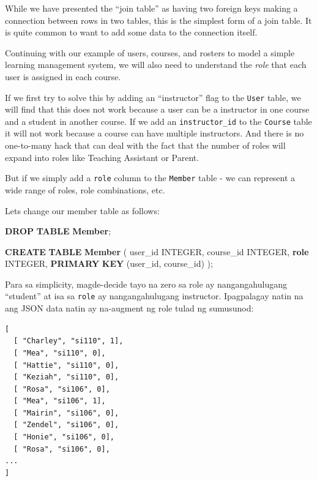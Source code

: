 \documentclass[10pt,]{book}
\newenvironment{Shaded}{}{}
\newcommand{\DataTypeTok}[1]{\textcolor[rgb]{0.56,0.13,0.00}{#1}}
\newcommand{\KeywordTok}[1]{\textcolor[rgb]{0.00,0.44,0.13}{\textbf{#1}}}
\newcommand{\NormalTok}[1]{#1}
\begin{document}
While we have presented the ``join table'' as having two foreign keys
making a connection between rows in two tables, this is the simplest
form of a join table. It is quite common to want to add some data to the
connection itself.

Continuing with our example of users, courses, and rosters to model a
simple learning management system, we will also need to understand the
\emph{role} that each user is assigned in each course.

If we first try to solve this by adding an ``instructor'' flag to the
\texttt{User} table, we will find that this does not work because a user
can be a instructor in one course and a student in another course. If we
add an \texttt{instructor\_id} to the \texttt{Course} table it will not
work because a course can have multiple instructors. And there is no
one-to-many hack that can deal with the fact that the number of roles
will expand into roles like Teaching Assistant or Parent.

But if we simply add a \texttt{role} column to the \texttt{Member} table
- we can represent a wide range of roles, role combinations, etc.

Lets change our member table as follows:

\begin{Shaded}
\begin{Highlighting}[]
\KeywordTok{DROP} \KeywordTok{TABLE} \KeywordTok{Member}\NormalTok{;}

\KeywordTok{CREATE} \KeywordTok{TABLE} \KeywordTok{Member}\NormalTok{ (}
\NormalTok{    user\_id     }\DataTypeTok{INTEGER}\NormalTok{,}
\NormalTok{    course\_id   }\DataTypeTok{INTEGER}\NormalTok{,}
    \KeywordTok{role}        \DataTypeTok{INTEGER}\NormalTok{,}
    \KeywordTok{PRIMARY} \KeywordTok{KEY}\NormalTok{ (user\_id, course\_id)}
\NormalTok{);}
\end{Highlighting}
\end{Shaded}

Para sa simplicity, magde-decide tayo na zero sa role ay
nangangahulugang ``student'' at isa sa \texttt{role} ay nangangahulugang
instructor. Ipagpalagay natin na ang JSON data natin ay na-augment ng
role tulad ng sumusunod:

{\small
\begin{verbatim}
[
  [ "Charley", "si110", 1],
  [ "Mea", "si110", 0],
  [ "Hattie", "si110", 0],
  [ "Keziah", "si110", 0],
  [ "Rosa", "si106", 0],
  [ "Mea", "si106", 1],
  [ "Mairin", "si106", 0],
  [ "Zendel", "si106", 0],
  [ "Honie", "si106", 0],
  [ "Rosa", "si106", 0],
...
]
\end{verbatim}
}
\end{document}
